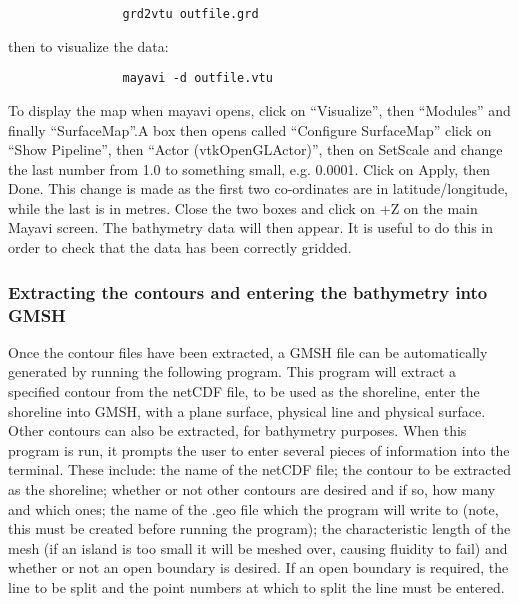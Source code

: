\begin{lstlisting}
				grd2vtu outfile.grd
\end{lstlisting}

then to visualize the data:
\begin{lstlisting}		
				mayavi -d outfile.vtu 
\end{lstlisting}

To display the map when mayavi opens, click on “Visualize”, then “Modules” and finally
“SurfaceMap”.A box then opens called “Configure SurfaceMap” click on “Show Pipeline”, then 
“Actor (vtkOpenGLActor)”, then on SetScale and change the last number from 1.0 to something 
small, e.g. 0.0001. Click on Apply, then Done. This change is made as the first two co-ordinates 
are in latitude/longitude, while the last is in metres. Close the two boxes and click on +Z 
on the main Mayavi screen. The bathymetry data will then appear. It is useful to do this in order 
to check that the data has been correctly gridded.

\subsubsection{Extracting the contours and entering the bathymetry into GMSH}

Once the contour files have been extracted, a GMSH file can be automatically generated by 
running the following program. This program will extract a specified contour from the 
netCDF file, to be used as the shoreline, enter the shoreline into GMSH, with a plane 
surface, physical line and physical surface. Other contours can also be extracted, 
for bathymetry purposes. When this program is run, it prompts the user to enter several 
pieces of information into the terminal. These include: the name of the netCDF file; 
the contour to be extracted as the shoreline; whether or not other contours are desired and 
if so, how many and  which ones; the name of the .geo file which the program will write to 
(note, this must be created before running the program); the characteristic length of 
the mesh (if an island is too small it will be meshed over, causing fluidity to fail) 
and whether or not an open boundary is desired. If an open boundary is required, the line 
to be split and the point numbers at which to split the line must be entered.

